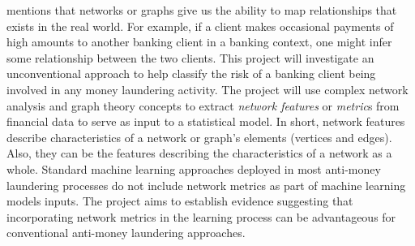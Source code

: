 \citet*{baesens2015fraud} mentions that networks or graphs give us the ability to map relationships that exists in the real world. For example, if a client makes occasional payments of high amounts to another banking client in a banking context, one might infer some relationship between the two clients. This project will investigate an unconventional approach to help classify the risk of a banking client being involved in any money laundering activity. The project will use complex network analysis and graph theory concepts to extract \textit{network features} or \textit{metric}s from financial data to serve as input to a statistical model. In short, network features describe characteristics of a network or graph's elements (vertices and edges). Also, they  can be the features describing the characteristics of a network as a whole.  Standard machine learning approaches deployed in most anti-money laundering processes do not include network metrics as part of machine learning models inputs. The project aims to establish evidence suggesting that incorporating network metrics in the learning process can be advantageous for conventional anti-money laundering approaches. 

